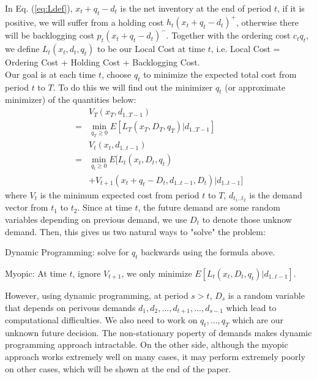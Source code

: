 \documentclass[twoside]{article}
\begin{document}
\begin{multicols}{2}
    In Eq. (\ref{eq:Ldef}), $x_t + q_t - d_t$ is the net inventory at the end of period $t$, if it is positive, we will suffer from a holding cost $h_t(x_t + q_t - d_t)^{+}$, otherwise there will be backlogging cost $p_t(x_t + q_t - d_t)^{-}$. Together with the ordering cost $c_tq_t$, we define $L_t(x_t,d_t,q_t)$ to be our Local Cost at time $t$, i.e. Local Cost = Ordering Cost + Holding Cost + Backlogging Cost.\\
    Our goal is at each time $t$, choose $q_t$ to minimize the expected total cost from period $t$ to $T$. To do this we will find out the minimizer $q_t$ (or approximate minimizer) of the quantities below:
    \begin{equation}\label{eq:Vt}
    \begin{array}{rl}
    & V_T(x_T,d_{1..T-1}) \\
    = & \min_{q_T \geq 0} E[L_T(x_T,D_T,q_T) | d_{1..T-1}]\\
    &V_t(x_t,d_{1..t-1}) \\
    = & \min_{q_t \geq 0} E[L_t(x_t,D_t,q_t)\\
    & +V_{t+1}(x_t + q_t - D_t, d_{1..t-1},D_t)|d_{1..t-1}]
    \end{array}
    \end{equation}
    where $V_t$ is the minimum expected cost from period $t$ to $T$, $d_{t_1..t_2}$ is the demand vector from $t_1$ to $t_2$. Since at time $t$, the future demand are some random variables depending on previous demand, we use $D_t$ to denote those unknow demand. Then, this gives us two natural ways to "solve" the problem:
    \begin{compactitem}
      \item 
        Dynamic Programming: solve for $q_t$ backwards using the formula above.
      \item
        Myopic: At time $t$, ignore $V_{t+1}$, we only minimize $E[L_t(x_t,D_t,q_t)|d_{1..t-1}]$.
    \end{compactitem}
     However, using dynamic programming, at period $s>t$, $D_s$ is a random variable that depends on perivous demands $d_1, d_2,...,d_{t+1},...,d_{s-1}$ which lead to computational difficulties. We also need to work on $q_t,...,q_T$ which are our unknown future decision. The non-stationary poperty of demands makes dynamic programming approach intractable. On the other side, although the myopic approach works extremely well on many cases\cite{CLAcha1}, it may perform extremely poorly on other cases, which will be shown at the end of the paper.\\


\end{multicols}
\end{document}
